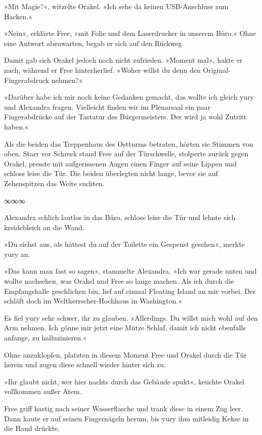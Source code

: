 »Mit Magie?«, witzelte Orakel. »Ich sehe da keinen USB-Anschluss zum Hacken.«

»Nein«, erklärte Free, »mit Folie und dem Laserdrucker in unserem Büro.« Ohne eine Antwort abzuwarten, begab er sich auf den Rückweg.

Damit gab sich Orakel jedoch noch nicht zufrieden. »Moment mal«, hakte er nach, während er Free hinterherlief. »Woher willst du denn den Original-Fingerabdruck nehmen?«

»Darüber habe ich mir noch keine Gedanken gemacht, das wollte ich gleich yury und Alexandra fragen. Vielleicht finden wir im Plenarsaal ein paar Fingerabdrücke auf der Tastatur des Bürgermeisters. Der wird ja wohl Zutritt haben.«

Als die beiden das Treppenhaus des Ostturms betraten, hörten sie Stimmen von oben. Starr vor Schreck stand Free auf der Türschwelle, stolperte zurück gegen Orakel, presste mit aufgerissenen Augen einen Finger auf seine Lippen und schloss leise die Tür. Die beiden überlegten nicht lange, bevor sie auf Zehenspitzen das Weite suchten.

\begin{center}
∞∞∞
\end{center}

Alexandra schlich lautlos in das Büro, schloss leise die Tür und lehnte sich kreidebleich an die Wand.

»Du siehst aus, als hättest du auf der Toilette ein Gespenst gesehen«, merkte yury an.

»Das kann man fast so sagen«, stammelte Alexandra. »Ich war gerade unten und wollte nachsehen, was Orakel und Free so lange machen. Als ich durch die Empfangshalle geschlichen bin, lief auf einmal Floating Island an mir vorbei. Der schläft doch im Weltherrscher-Hochhaus in Washington.«

Es fiel yury sehr schwer, ihr zu glauben. »Allerdings. Du willst mich wohl auf den Arm nehmen. Ich gönne mir jetzt eine Mütze Schlaf, damit ich nicht ebenfalls anfange, zu halluzinieren.«

Ohne anzuklopfen, platzten in diesem Moment Free und Orakel durch die Tür herein und zogen diese schnell wieder hinter sich zu.

»Ihr glaubt nicht, wer hier nachts durch das Gebäude spukt«, keuchte Orakel vollkommen außer Atem.

Free griff hastig nach seiner Wasserflasche und trank diese in einem Zug leer. Dann kaute er auf seinen Fingernägeln herum, bis yury ihm mitleidig Kekse in die Hand drückte.

